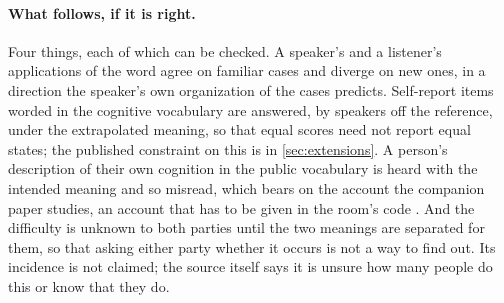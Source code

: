 \paragraph{What follows, if it is right.} Four things, each of which can be checked. A speaker's and a listener's applications of the word agree on familiar cases and diverge on new ones, in a direction the speaker's own organization of the cases predicts. Self-report items worded in the cognitive vocabulary are answered, by speakers off the reference, under the extrapolated meaning, so that equal scores need not report equal states; the published constraint on this is in \autoref{sec:extensions}. A person's description of their own cognition in the public vocabulary is heard with the intended meaning and so misread, which bears on the account the companion paper studies, an account that has to be given in the room's code \cite{Unconveyable}. And the difficulty is unknown to both parties until the two meanings are separated for them, so that asking either party whether it occurs is not a way to find out. Its incidence is not claimed; the source itself says it is unsure how many people do this or know that they do.

